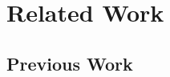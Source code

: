 \chapter{Related Work}\label{chap:related-work}

\section{\MSTlong{}}

\section{Previous \cplop{} Work}